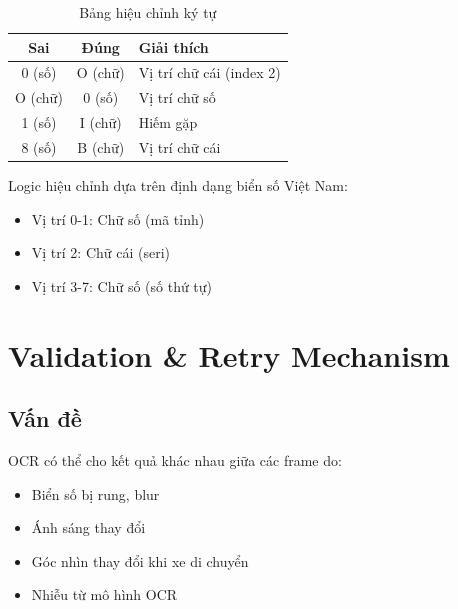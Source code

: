 \begin{table}[!ht]
\centering
\caption{Bảng hiệu chỉnh ký tự}
\label{tab:char_correction}
\begin{tabular}{|c|c|l|}
\hline
\textbf{Sai} & \textbf{Đúng} & \textbf{Giải thích} \\ \hline
0 (số) & O (chữ) & Vị trí chữ cái (index 2) \\ \hline
O (chữ) & 0 (số) & Vị trí chữ số \\ \hline
1 (số) & I (chữ) & Hiếm gặp \\ \hline
8 (số) & B (chữ) & Vị trí chữ cái \\ \hline
\end{tabular}
\end{table}

Logic hiệu chỉnh dựa trên định dạng biển số Việt Nam:
\begin{itemize}
    \item Vị trí 0-1: Chữ số (mã tỉnh)
    \item Vị trí 2: Chữ cái (seri)
    \item Vị trí 3-7: Chữ số (số thứ tự)
\end{itemize}

\section{Validation \& Retry Mechanism}

\subsection{Vấn đề}
OCR có thể cho kết quả khác nhau giữa các frame do:
\begin{itemize}
    \item Biển số bị rung, blur
    \item Ánh sáng thay đổi
    \item Góc nhìn thay đổi khi xe di chuyển
    \item Nhiễu từ mô hình OCR
\end{itemize}

